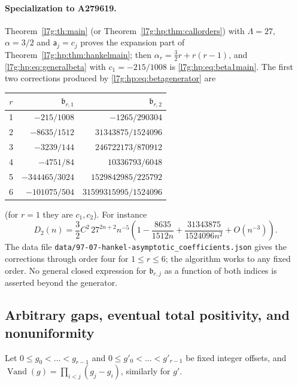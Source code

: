 \documentclass[11pt,letterpaper]{article}
\newcommand{\file}[1]{\nolinkurl{#1}}
\theoremstyle{remark}\newtheorem{remark}[theorem]{Remark}
\newcounter{l7gtrsavedeq}
\begin{document}
\paragraph{Specialization to A279619.}
Theorem~\ref{l7g:th:main} (or Theorem~\ref{l7g:hp:thm:callorders}) with
$\Lambda=27$, $\alpha=3/2$ and $\mathsf a_j=c_j$ proves the expansion part
of Theorem~\ref{l7g:hp:thm:hankelmain}; then $\alpha_r=\frac32r+r(r-1)$,
and \eqref{l7g:hp:eq:generalbeta} with $c_1=-215/1008$ is
\eqref{l7g:hp:eq:beta1main}. The first two corrections produced by
\eqref{l7g:hp:eq:betagenerator} are
\begin{center}\small
\begin{tabular}{crr}
\toprule
$r$ & $\mathfrak b_{r,1}$ & $\mathfrak b_{r,2}$\\
\midrule
1 & $-215/1008$ & $-1265/290304$\\
2 & $-8635/1512$ & $31343875/1524096$\\
3 & $-3239/144$ & $246722173/870912$\\
4 & $-4751/84$ & $10336793/6048$\\
5 & $-344465/3024$ & $1529842985/225792$\\
6 & $-101075/504$ & $31599315995/1524096$\\
\bottomrule
\end{tabular}
\end{center}
(for $r=1$ they are $c_1,c_2$). For instance
\begin{equation}\label{l7g:hp:eq:D2exp}
 D_2(n)=\frac32C^2\,27^{2n+2}n^{-5}
 \left(1-\frac{8635}{1512n}+\frac{31343875}{1524096n^2}+O(n^{-3})\right).
\end{equation}
The data file \file{data/97-07-hankel-asymptotic_coefficients.json} gives
the corrections through order four for $1\le r\le6$; the algorithm works to
any fixed order. No general closed expression for $\mathfrak b_{r,j}$ as a
function of both indices is asserted beyond the generator.

\subsection{Arbitrary gaps, eventual total positivity, and nonuniformity}\label{l7g:hp:sec:tails}
Let $0\le g_0<\dots<g_{r-1}$ and $0\le g'_0<\dots<g'_{r-1}$ be fixed integer
offsets, and $\operatorname{Vand}(g)=\prod_{i<j}(g_j-g_i)$, similarly for $g'$.
\end{document}
